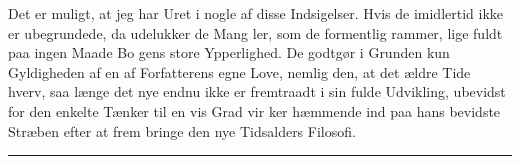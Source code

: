 \documentclass[12pt,a4paper,openany]{book}
\newcommand{\piecerule}{\par\begin{center}\rule{1.5cm}{0.4pt}\end{center}\par}
\begin{document}
Det er muligt, at jeg har Uret i nogle af disse Indsigelser.
Hvis de imidlertid ikke er ubegrundede, da udelukker de Mang\-%
ler, som de formentlig rammer, lige fuldt paa ingen Maade Bo\-%
gens store Ypperlighed. De godtgør i Grunden kun Gyldigheden
af en af Forfatterens egne Love, nemlig den, at det ældre Tide\-%
hverv, saa længe det nye endnu ikke er fremtraadt i sin fulde
Udvikling, ubevidst for den enkelte Tænker til en vis Grad vir\-%
ker hæmmende ind paa hans bevidste Stræben efter at frem\-%
bringe den nye Tidsalders Filosofi.
\piecerule
\end{document}
